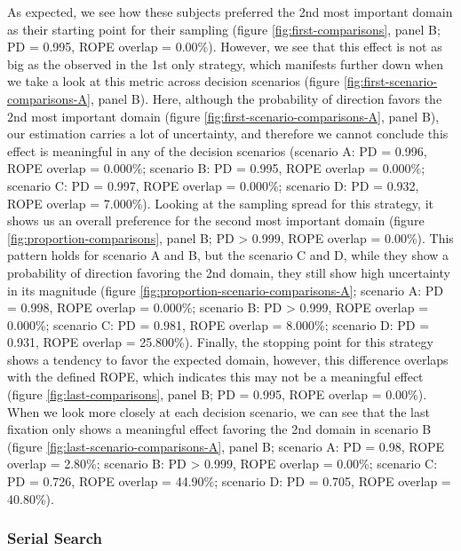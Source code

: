 \documentclass[
  english,
  man]{apa6}
\begin{document}
As expected, we see how these subjects preferred the 2nd most important domain as their starting point for their sampling (figure \ref{fig:first-comparisons}, panel B; PD = 0.995, ROPE overlap = 0.00\%). However, we see that this effect is not as big as the observed in the 1st only strategy, which manifests further down when we take a look at this metric across decision scenarios (figure \ref{fig:first-scenario-comparisons-A}, panel B). Here, although the probability of direction favors the 2nd most important domain (figure \ref{fig:first-scenario-comparisons-A}, panel B), our estimation carries a lot of uncertainty, and therefore we cannot conclude this effect is meaningful in any of the decision scenarios (scenario A: PD = 0.996, ROPE overlap = 0.000\%; scenario B: PD = 0.995, ROPE overlap = 0.000\%; scenario C: PD = 0.997, ROPE overlap = 0.000\%; scenario D: PD = 0.932, ROPE overlap = 7.000\%). Looking at the sampling spread for this strategy, it shows us an overall preference for the second most important domain (figure \ref{fig:proportion-comparisons}, panel B; PD \textgreater{} 0.999, ROPE overlap = 0.00\%). This pattern holds for scenario A and B, but the scenario C and D, while they show a probability of direction favoring the 2nd domain, they still show high uncertainty in its magnitude (figure \ref{fig:proportion-scenario-comparisons-A}; scenario A: PD = 0.998, ROPE overlap = 0.000\%; scenario B: PD \textgreater{} 0.999, ROPE overlap = 0.000\%; scenario C: PD = 0.981, ROPE overlap = 8.000\%; scenario D: PD = 0.931, ROPE overlap = 25.800\%). Finally, the stopping point for this strategy shows a tendency to favor the expected domain, however, this difference overlaps with the defined ROPE, which indicates this may not be a meaningful effect (figure \ref{fig:last-comparisons}, panel B; PD = 0.995, ROPE overlap = 0.00\%). When we look more closely at each decision scenario, we can see that the last fixation only shows a meaningful effect favoring the 2nd domain in scenario B (figure \ref{fig:last-scenario-comparisons-A}, panel B; scenario A: PD = 0.98, ROPE overlap = 2.80\%; scenario B: PD \textgreater{} 0.999, ROPE overlap = 0.00\%; scenario C: PD = 0.726, ROPE overlap = 44.90\%; scenario D: PD = 0.705, ROPE overlap = 40.80\%).

\hypertarget{serial-search}{%
\subsubsection{Serial Search}\label{serial-search}}
\end{document}

